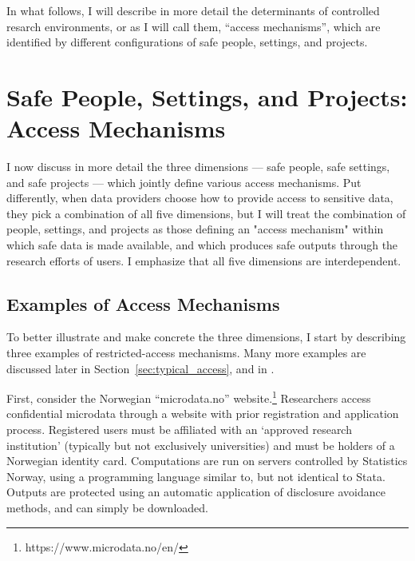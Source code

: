 In what follows, I will describe in more detail the determinants of controlled resarch environments, or as I will call them, ``access mechanisms'', which are identified by different configurations of safe people, settings, and projects. 

\section{Safe People, Settings, and Projects: Access Mechanisms}

I now discuss in more detail the three dimensions --- safe people, safe settings, and safe projects --- which jointly define  various access mechanisms. Put differently, when data providers choose how to provide access to sensitive data, they pick a combination of all five dimensions, but I will treat the combination of people, settings, and projects as those defining an "access mechanism" within which safe data is made available, and which produces safe outputs through the research efforts of users. I emphasize that all five dimensions are interdependent. 

\subsection{Examples of Access Mechanisms}

To better illustrate and make concrete the three dimensions, I start by describing three examples of restricted-access mechanisms. Many more examples are discussed later in Section~\ref{sec:typical_access}, and in \cite{shen_physically_2021}.

First, consider the Norwegian ``microdata.no'' website.\footnote{{https://www.microdata.no/en/}} Researchers access confidential microdata through a website with prior registration and application process. Registered users must be affiliated with an `approved research institution' (typically but not exclusively universities) and must be holders of a Norwegian identity card. Computations are run on servers controlled by Statistics Norway, using a programming language similar to, but not identical to Stata. Outputs are protected using an automatic application of disclosure avoidance methods, and can simply be downloaded. 


